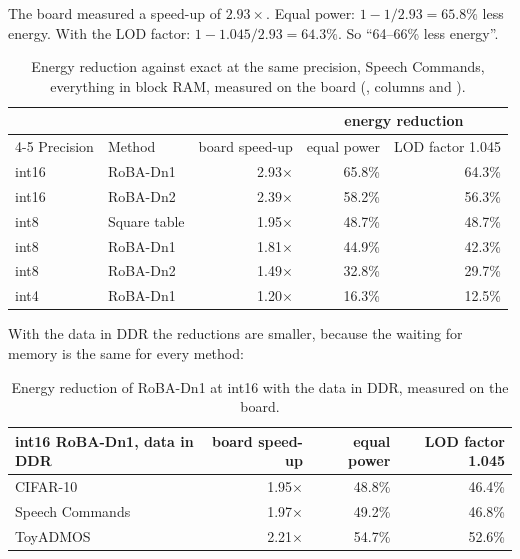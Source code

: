 \begin{example}
The board measured a speed-up of $2.93\times$. Equal power: $1 - 1/2.93 = 65.8\%$ less energy. With the LOD
factor: $1 - 1.045/2.93 = 64.3\%$. So ``64--66\% less energy''.
\end{example}

\begin{table}[H]
\centering
\small
\begin{tabularx}{\linewidth}{lXrrr}
\toprule
 & & & \multicolumn{2}{c}{energy reduction}\\
\cmidrule(lr){4-5}
Precision & Method & board speed-up & equal power & LOD factor 1.045\\
\midrule
int16 & RoBA-Dn1 & 2.93$\times$ & 65.8\% & 64.3\%\\
int16 & RoBA-Dn2 & 2.39$\times$ & 58.2\% & 56.3\%\\
int8 & Square table & 1.95$\times$ & 48.7\% & 48.7\%\\
int8 & RoBA-Dn1 & 1.81$\times$ & 44.9\% & 42.3\%\\
int8 & RoBA-Dn2 & 1.49$\times$ & 32.8\% & 29.7\%\\
int4 & RoBA-Dn1 & 1.20$\times$ & 16.3\% & 12.5\%\\
\bottomrule
\end{tabularx}
\caption{Energy reduction against exact at the same precision, Speech Commands, everything in block RAM, measured
on the board (, columns  and
).}
\label{tab:boardenergy}
\end{table}

With the data in DDR the reductions are smaller, because the waiting for memory is the same for every method:

\begin{table}[H]
\centering
\small
\begin{tabular}{lrrr}
\toprule
int16 RoBA-Dn1, data in DDR & board speed-up & equal power & LOD factor 1.045\\
\midrule
CIFAR-10 & 1.95$\times$ & 48.8\% & 46.4\%\\
Speech Commands & 1.97$\times$ & 49.2\% & 46.8\%\\
ToyADMOS & 2.21$\times$ & 54.7\% & 52.6\%\\
\bottomrule
\end{tabular}
\caption{Energy reduction of RoBA-Dn1 at int16 with the data in DDR, measured on the board.}
\end{table}

